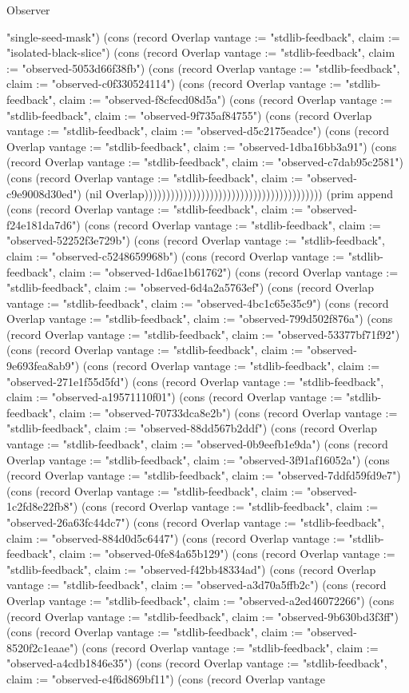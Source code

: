 \begin{lexlean}{Observer}
\begin{semanticmodule}
{"single-seed-mask"}) (cons (record Overlap {vantage := "stdlib-feedback", claim := "isolated-black-slice"}) (cons (record Overlap {vantage := "stdlib-feedback", claim := "observed-5053d66f38fb"}) (cons (record Overlap {vantage := "stdlib-feedback", claim := "observed-c0f330524114"}) (cons (record Overlap {vantage := "stdlib-feedback", claim := "observed-f8cfecd08d5a"}) (cons (record Overlap {vantage := "stdlib-feedback", claim := "observed-9f735af84755"}) (cons (record Overlap {vantage := "stdlib-feedback", claim := "observed-d5c2175eadce"}) (cons (record Overlap {vantage := "stdlib-feedback", claim := "observed-1dba16bb3a91"}) (cons (record Overlap {vantage := "stdlib-feedback", claim := "observed-c7dab95c2581"}) (cons (record Overlap {vantage := "stdlib-feedback", claim := "observed-c9e9008d30ed"}) (nil Overlap))))))))))))))))))))))))))))))))))))))))) (prim append (cons (record Overlap {vantage := "stdlib-feedback", claim := "observed-f24e181da7d6"}) (cons (record Overlap {vantage := "stdlib-feedback", claim := "observed-52252f3e729b"}) (cons (record Overlap {vantage := "stdlib-feedback", claim := "observed-c5248659968b"}) (cons (record Overlap {vantage := "stdlib-feedback", claim := "observed-1d6ae1b61762"}) (cons (record Overlap {vantage := "stdlib-feedback", claim := "observed-6d4a2a5763ef"}) (cons (record Overlap {vantage := "stdlib-feedback", claim := "observed-4bc1c65e35c9"}) (cons (record Overlap {vantage := "stdlib-feedback", claim := "observed-799d502f876a"}) (cons (record Overlap {vantage := "stdlib-feedback", claim := "observed-53377bf71f92"}) (cons (record Overlap {vantage := "stdlib-feedback", claim := "observed-9e693fea8ab9"}) (cons (record Overlap {vantage := "stdlib-feedback", claim := "observed-271e1f55d5fd"}) (cons (record Overlap {vantage := "stdlib-feedback", claim := "observed-a19571110f01"}) (cons (record Overlap {vantage := "stdlib-feedback", claim := "observed-70733dca8e2b"}) (cons (record Overlap {vantage := "stdlib-feedback", claim := "observed-88dd567b2ddf"}) (cons (record Overlap {vantage := "stdlib-feedback", claim := "observed-0b9eefb1e9da"}) (cons (record Overlap {vantage := "stdlib-feedback", claim := "observed-3f91af16052a"}) (cons (record Overlap {vantage := "stdlib-feedback", claim := "observed-7ddfd59fd9e7"}) (cons (record Overlap {vantage := "stdlib-feedback", claim := "observed-1c2fd8e22fb8"}) (cons (record Overlap {vantage := "stdlib-feedback", claim := "observed-26a63fc44dc7"}) (cons (record Overlap {vantage := "stdlib-feedback", claim := "observed-884d0d5c6447"}) (cons (record Overlap {vantage := "stdlib-feedback", claim := "observed-0fe84a65b129"}) (cons (record Overlap {vantage := "stdlib-feedback", claim := "observed-f42bb48334ad"}) (cons (record Overlap {vantage := "stdlib-feedback", claim := "observed-a3d70a5ffb2c"}) (cons (record Overlap {vantage := "stdlib-feedback", claim := "observed-a2ed46072266"}) (cons (record Overlap {vantage := "stdlib-feedback", claim := "observed-9b630bd3f3ff"}) (cons (record Overlap {vantage := "stdlib-feedback", claim := "observed-8520f2c1eaae"}) (cons (record Overlap {vantage := "stdlib-feedback", claim := "observed-a4cdb1846e35"}) (cons (record Overlap {vantage := "stdlib-feedback", claim := "observed-e4f6d869bf11"}) (cons (record Overlap {vantage }
\end{semanticmodule}
\end{lexlean}
